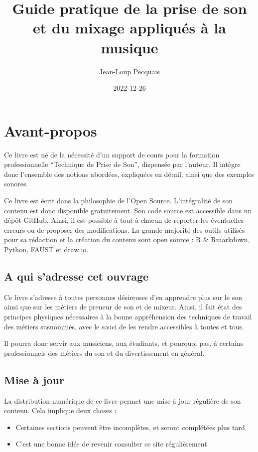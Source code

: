 \documentclass[
]{book}
\title{Guide pratique de la prise de son et du mixage appliqués à la musique}
\author{Jean-Loup Pecquais}
\date{2022-12-26}
\providecommand{\tightlist}{%
  \setlength{\itemsep}{0pt}\setlength{\parskip}{0pt}}
\begin{document}
\maketitle

{
\setcounter{tocdepth}{1}
\tableofcontents
}
\hypertarget{avant-propos}{%
\chapter{Avant-propos}\label{avant-propos}}

Ce livre est né de la nécessité d'un support de cours pour la formation professionnelle ``Technique de Prise de Son'', dispensée par l'auteur. Il intègre donc l'ensemble des notions abordées, expliquées en détail, ainsi que des exemples sonores.

Ce livre est écrit dans la philosophie de l'Open Source. L'intégralité de son contenu est donc disponible gratuitement. Son code source est accessible dans un dépôt GitHub. Ainsi, il est possible à tout à chacun de reporter les éventuelles erreurs ou de proposer des modifications. La grande majorité des outils utilisés pour sa rédaction et la création du contenu sont open source : R \& Rmarkdown, Python, FAUST et draw.io.

\hypertarget{a-qui-sadresse-cet-ouvrage}{%
\section{A qui s'adresse cet ouvrage}\label{a-qui-sadresse-cet-ouvrage}}

Ce livre s'adresse à toutes personnes désireuses d'en apprendre plus sur le son ainsi que sur les métiers de preneur de son et de mixeur. Ainsi, il fait état des principes physiques nécessaires à la bonne appréhension des techniques de travail des métiers susnommés, avec le souci de les rendre accessibles à toutes et tous.

Il pourra donc servir aux musiciens, aux étudiants, et pourquoi pas, à certains professionnels des métiers du son et du divertissement en général.

\hypertarget{mise-uxe0-jour}{%
\section{Mise à jour}\label{mise-uxe0-jour}}

La distribution numérique de ce livre permet une mise à jour régulière de son contenu. Cela implique deux choses :

\begin{itemize}
\tightlist
\item
  Certaines sections peuvent être incomplètes, et seront complétées plus tard
\item
  C'est une bonne idée de revenir consulter ce site régulièrement
\end{itemize}
\end{document}
